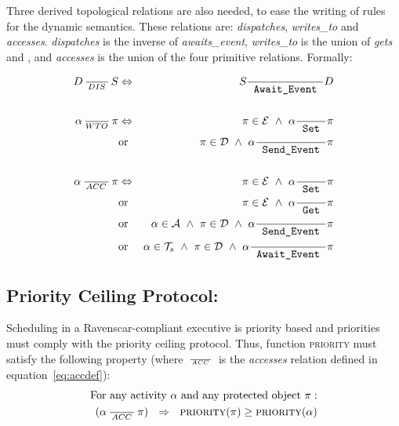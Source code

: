 Three derived topological relations are also needed, to ease the
writing of rules for the dynamic semantics. These relations are:
\emph{dispatches}, \emph{writes\_to} and
\emph{accesses}. \emph{dispatches} is the inverse of
\emph{awaits\_event}, \emph{writes\_to} is the union of \emph{gets} and
, and \emph{accesses} is the union of the
four primitive relations. Formally:

\begin{eqnarray}
  D \RL{DIS} S & \Leftrightarrow & S \rgvt D \label{geinvd}\\
  \nonumber\\
  \alpha \RS{WTO} \pi & \Leftrightarrow & \pi \in {\cal E} \ \wedge \ \alpha \rset \pi\\ 
  \nonumber
  & \text{or} & \pi \in {\cal D} \ \wedge \ \alpha \rsvt \pi\\
  \nonumber \\
  \label{eq:accdef}
  \alpha \RL{ACC} \pi & \Leftrightarrow & 
  \pi \in {\cal E} \ \wedge \ \alpha \rset \pi\\
  \nonumber
  & \text{or} & \pi \in {\cal E} \ \wedge \ \alpha \rget \pi\\ 
  \nonumber 
  & \text{or} & \alpha \in {\cal A} \ \wedge \ \pi \in {\cal D} \ \wedge \ \alpha \rsvt \pi\\
  \nonumber 
  & \text{or} & \alpha \in {\cal T}_s \  \wedge \ \pi
  \in {\cal D} \ \wedge \ \alpha \rgvt \pi
\end{eqnarray}
 
\subsection{Priority Ceiling Protocol:}
Scheduling in a Ravenscar-compliant executive is priority based and
priorities must comply with the priority ceiling protocol. Thus,
function {\scshape priority} must satisfy the following property
(where $\,\frac{}{\,^{{ACC}}\,}\,$ is the \emph{accesses} relation defined in
equation~\ref{eq:accdef}):
\begin{eqnarray}
  \text{For any activity} \  \alpha \ \text{and any protected object} \ \pi: 
  \nonumber \\
  (\alpha \RL{ACC} \pi) \ \ 
  \Rightarrow \ \  \text{\scshape priority}(\pi) \geq \text{\scshape priority}(\alpha)
\end{eqnarray}

